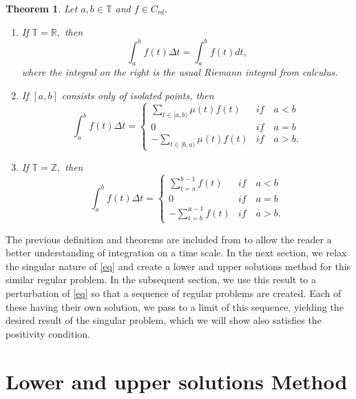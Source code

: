 \documentclass[12pt,reqno]{amsart}
\newtheorem{theorem}{Theorem}[section]
\begin{document}
\begin{theorem}
	Let $a,b \in \mathbb{T}$ and $f \in C_{rd}.$
		\begin{enumerate}
		\item If $\mathbb{T} = \mathbb{R},$ then $$\int_{a}^{b} f(t) \Delta t = \int_{a}^{b} f(t) dt,$$ where the integral on the right is the usual Riemann integral from calculus.

		\item If $[a,b]$ consists only of isolated points, then
		\begin{equation*}
			\int_{a}^{b} f(t) \Delta t = \left\{
			\begin{array}{ll}
				\sum_{t\in[a,b)} \mu(t)f(t) & if \quad a < b \\
				0 & if \quad a = b \\
				- \sum_{t\in[b,a)} \mu(t)f(t) & if \quad a > b.
			\end{array}
			\right.
		\end{equation*}

		\item If $\mathbb{T} = \mathbb{Z},$ then 
		\begin{equation*}
			\int_{a}^{b} f(t) \Delta t = \left\{
			\begin{array}{ll}
				\sum_{t=a}^{b-1} f(t) & if \quad a < b \\
				0 & if \quad a = b \\
				- \sum_{t=b}^{a-1} f(t) & if \quad a > b.
			\end{array}
			\right.
		\end{equation*}
	\end{enumerate}
\end{theorem}

The previous definition and theorems are included from \cite{bohner2001} to allow the reader a better understanding of integration on a time scale.  In the next section, we relax the singular nature of \eqref{eq} and create a lower and upper solutions method for this similar regular problem.  In the subsequent section, we use this result to a perturbation of \eqref{eq} so that a sequence of regular problems are created.  Each of these having their own solution, we pass to a limit of this sequence, yielding the desired result of the singular problem, which we will show also satisfies the positivity condition.


\section{Lower and upper solutions Method}
\end{document}
